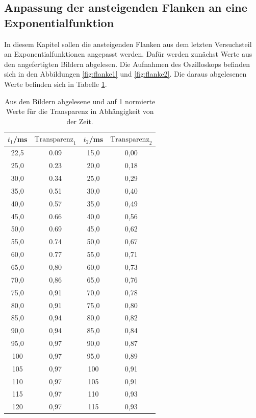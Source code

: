 \subsection{Anpassung der ansteigenden Flanken an eine Exponentialfunktion}
\label{subsec:flanken}

In diesem Kapitel sollen die ansteigenden Flanken aus dem letzten Versuchsteil an
Exponentialfunktionen angepasst werden. Dafür werden zunächst Werte aus den angefertigten
Bildern abgelesen. Die Aufnahmen des Oszilloskops befinden sich in den Abbildungen
\ref{fig:flanke1} und \ref{fig:flanke2}. Die daraus abgelesenen Werte befinden sich in
Tabelle \ref{tab:flanke}.

\begin{table}[htp]
	\begin{center}
    \caption{Aus den Bildern abgelesene und auf 1 normierte Werte für die Transparenz in Abhängigkeit von der Zeit.}
    \label{tab:flanke}
		\begin{tabular}{cccc}
		\toprule
			{$t_1$/ms} & {$\text{Transparenz}_1$} & {$t_2$/ms} & {$\text{Transparenz}_2$}\\
			\midrule
			22,5 & 0.09 & 15,0 & 0,00\\
			25,0 & 0.23 & 20,0 & 0,18\\
			30,0 & 0.34 & 25,0 & 0,29\\
			35,0 & 0.51 & 30,0 & 0,40\\
			40,0 & 0.57 & 35,0 & 0,49\\
			45,0 & 0.66 & 40,0 & 0,56\\
			50,0 & 0.69 & 45,0 & 0,62\\
			55,0 & 0.74 & 50,0 & 0,67\\
			60,0 & 0.77 & 55,0 & 0,71\\
			65,0 & 0,80 & 60,0 & 0,73\\
			70,0 & 0,86 & 65,0 & 0,76\\
			75,0 & 0,91 & 70,0 & 0,78\\
			80,0 & 0,91 & 75,0 & 0,80\\
			85,0 & 0,94 & 80,0 & 0,82\\
			90,0 & 0,94 & 85,0 & 0,84\\
			95,0 & 0,97 & 90,0 & 0,87\\
			100 & 0,97 & 95,0 & 0,89\\
			105 & 0,97 & 100 & 0,91\\
			110 & 0,97 & 105 & 0,91\\
			115 & 0,97 & 110 & 0,93\\
			120 & 0,97 & 115 & 0,93\\

\end{tabular}
\end{center}
\end{table}
